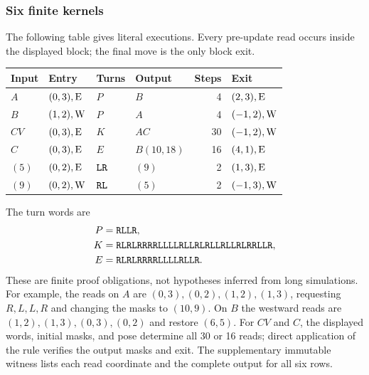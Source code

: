 \subsubsection{Six finite kernels}
The following table gives literal executions. Every pre-update read occurs
inside the displayed block; the final move is the only block exit.
\begin{center}\small
\begin{tabular}{@{}llllrl@{}}
\toprule
Input & Entry & Turns & Output & Steps & Exit\\
\midrule
$A$ & $(0,3),\mathrm E$ & $P$ & $B$ & 4 & $(2,3),\mathrm E$\\
$B$ & $(1,2),\mathrm W$ & $P$ & $A$ & 4 & $(-1,2),\mathrm W$\\
$CV$ & $(0,3),\mathrm E$ & $K$ & $AC$ & 30 & $(-1,2),\mathrm W$\\
$C$ & $(0,3),\mathrm E$ & $E$ & $B(10,18)$ & 16 & $(4,1),\mathrm E$\\
$(5)$ & $(0,2),\mathrm E$ & $\texttt{LR}$ & $(9)$ & 2 & $(1,3),\mathrm E$\\
$(9)$ & $(0,2),\mathrm W$ & $\texttt{RL}$ & $(5)$ & 2 & $(-1,3),\mathrm W$\\
\bottomrule
\end{tabular}
\end{center}
The turn words are
\begin{align*}
P&=\texttt{RLLR},\\
K&=\texttt{RLRLRRRRLLLLRLLRLRLLRLLRLRRLLR},\\
E&=\texttt{RLRLRRRRLLLLRLLR}.
\end{align*}
These are finite proof obligations, not hypotheses inferred from long simulations.
For example, the reads on $A$ are $(0,3),(0,2),(1,2),(1,3)$, requesting
$R,L,L,R$ and changing the masks to $(10,9)$. On $B$ the westward reads are
$(1,2),(1,3),(0,3),(0,2)$ and restore $(6,5)$. For $CV$ and $C$, the displayed
words, initial masks, and pose determine all 30 or 16 reads; direct application
of the rule verifies the output masks and exit. The supplementary immutable
witness lists each read coordinate and the complete output for all six rows.

